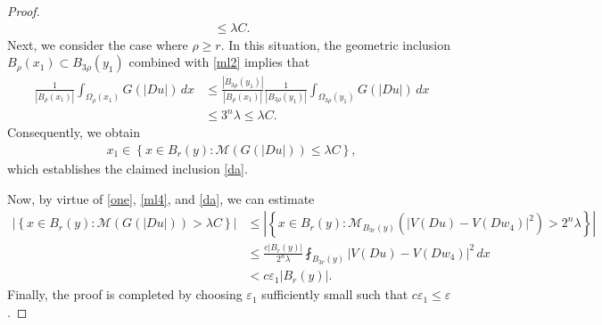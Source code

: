 \documentclass[10pt,a4paper]{amsart}
\begin{document}
\begin{proof}
\begin{align*}
 		\leq \lambda C.
 	\end{align*}
  Next, we consider the case where $\rho\geq r$. In this situation, the geometric inclusion $B_\rho(x_1)\subset B_{3\rho}(y_1)$ combined with \eqref{ml2} implies that
 	\begin{align*}
 		\frac{1}{|B_\rho(x_1)|}
 		\int_{\Omega_\rho(x_1)}G(|Du|)\,dx
 		&\leq
 		\frac{|B_{3\rho}(y_1)|}{|B_\rho(x_1)|}
 		\frac{1}{|B_{3\rho}(y_1)|}
 		\int_{\Omega_{3\rho}(y_1)}G(|Du|)\,dx
 		\nonumber\\
 		&\leq 3^n\lambda
 		\leq \lambda C .
 	\end{align*}
 	 Consequently, we obtain
 	\begin{align*}
 		x_1\in
 		\left\{
 		x\in B_r(y):
 		\mathcal{M}(G(|Du|))\leq \lambda C
 		\right\},
 	\end{align*}
which establishes the claimed inclusion \eqref{da}.
 	
 Now, by virtue of \eqref{one}, \eqref{ml4}, and \eqref{da}, we can estimate
 	\begin{align*}
 		\left|
 		\left\{
 		x\in B_r(y):
 		\mathcal{M}(G(|Du|))>\lambda C
 		\right\}
 		\right|
 		&\leq
 		\left|
 		\left\{
 		x\in B_r(y):
 		\mathcal{M}_{B_{3r}(y)}
 		(|V(Du)-V(Dw_4)|^2)>2^n\lambda
 		\right\}
 		\right|
 		\nonumber\\
 		&\leq
 		\frac{c|B_r(y)|}{2^n\lambda}
 		\fint_{B_{3r}(y)}
 		|V(Du)-V(Dw_4)|^2\,dx
 		\nonumber\\
 		&<
 		c\varepsilon_1|B_r(y)|.
 	\end{align*}
 Finally, the proof is completed by choosing $\varepsilon_1$ sufficiently small such that $c\varepsilon_1\leq \varepsilon$.
 	

\end{proof}
\end{document}
